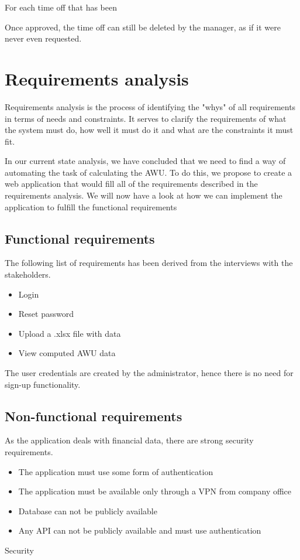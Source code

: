 \documentclass[12pt,oneside]{fithesis2}
\begin{document}
    For each time off that has been 
    
    Once approved, the time off can still be deleted by the manager, as if it were never even requested.
    
    
    \section{Requirements analysis}
    Requirements analysis is the process of identifying the "whys" of all requirements in terms of needs and constraints. It serves to clarify the requirements of what the system must do, how well it must do it and what are the constraints it must fit.\cite{systems-engineering}
    
    In our current state analysis, we have concluded that we need to find a way of automating the task of calculating the AWU. To do this, we propose to create a web application that would fill all of the requirements described in the requirements analysis. We will now have a look at how we can implement the application to fulfill the functional requirements
    \subsection{Functional requirements}
    
    The following list of requirements has been derived from the interviews with the stakeholders.
    \begin{itemize}
        \item Login
        \item Reset password
        \item Upload a .xlsx file with data
        \item View computed AWU data
    \end{itemize}
    The user credentials are created by the administrator, hence there is no need for sign-up functionality.

    
    \subsection{Non-functional requirements}
    As the application deals with financial data, there are strong security requirements.
    \begin{itemize}
        \item The application must use some form of authentication
        \item The application must be available only through a VPN from company office
        \item Database can not be publicly available
        \item Any API can not be publicly available and must use authentication
    \end{itemize}
    Security
    
\end{document}
